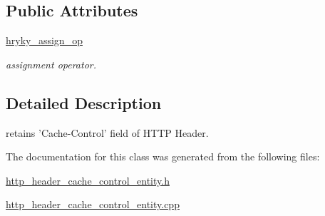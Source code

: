 \subsection*{Public Attributes}
\begin{DoxyCompactItemize}
\item 
\hypertarget{classhryky_1_1http_1_1header_1_1cache_1_1control_1_1_entity_a362a2210fa988f6b856647c29d16d9fb}{\hyperlink{classhryky_1_1http_1_1header_1_1cache_1_1control_1_1_entity_a362a2210fa988f6b856647c29d16d9fb}{hryky\-\_\-assign\-\_\-op}}\label{classhryky_1_1http_1_1header_1_1cache_1_1control_1_1_entity_a362a2210fa988f6b856647c29d16d9fb}

\begin{DoxyCompactList}\small\item\em assignment operator. \end{DoxyCompactList}\end{DoxyCompactItemize}


\subsection{Detailed Description}
retains 'Cache-\/\-Control' field of H\-T\-T\-P Header. 

The documentation for this class was generated from the following files\-:\begin{DoxyCompactItemize}
\item 
\hyperlink{http__header__cache__control__entity_8h}{http\-\_\-header\-\_\-cache\-\_\-control\-\_\-entity.\-h}\item 
\hyperlink{http__header__cache__control__entity_8cpp}{http\-\_\-header\-\_\-cache\-\_\-control\-\_\-entity.\-cpp}\end{DoxyCompactItemize}
